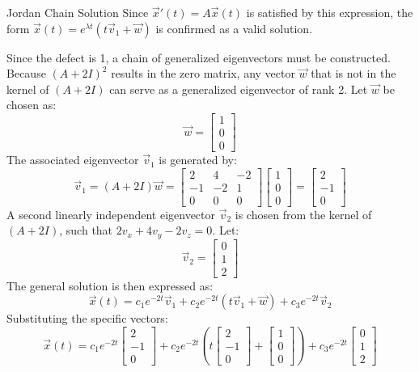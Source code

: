 \begin{enumerate}
\begin{define}{Jordan Chain Solution}
  Since $\vec{x}'(t) = A\vec{x}(t)$ is satisfied by this expression, the form $\vec{x}(t) = e^{\lambda t}(t\vec{v}_1 + \vec{w})$ is confirmed as a valid solution.
\end{define}
  Since the defect is 1, a chain of generalized eigenvectors must be constructed. Because $(A+2I)^2$ results in the zero matrix, any vector $\vec{w}$ that is not in the kernel of $(A+2I)$ can serve as a generalized eigenvector of rank 2. Let $\vec{w}$ be chosen as:
  \[
  \vec{w} = \begin{bmatrix} 1 \\ 0 \\ 0 \end{bmatrix}
  \]
  The associated eigenvector $\vec{v}_1$ is generated by:
  \[
  \vec{v}_1 = (A+2I)\vec{w} = \begin{bmatrix} 2 & 4 & -2 \\ -1 & -2 & 1 \\ 0 & 0 & 0 \end{bmatrix} \begin{bmatrix} 1 \\ 0 \\ 0 \end{bmatrix} = \begin{bmatrix} 2 \\ -1 \\ 0 \end{bmatrix}
  \]
  A second linearly independent eigenvector $\vec{v}_2$ is chosen from the kernel of $(A+2I)$, such that $2v_x + 4v_y - 2v_z = 0$. Let:
  \[
  \vec{v}_2 = \begin{bmatrix} 0 \\ 1 \\ 2 \end{bmatrix}
  \]
  The general solution is then expressed as:
  \[
  \vec{x}(t) = c_1 e^{-2t} \vec{v}_1 + c_2 e^{-2t} (t \vec{v}_1 + \vec{w}) + c_3 e^{-2t} \vec{v}_2
  \]
  Substituting the specific vectors:
  \[
  \vec{x}(t) = c_1 e^{-2t} \begin{bmatrix} 2 \\ -1 \\ 0 \end{bmatrix} + c_2 e^{-2t} \left( t \begin{bmatrix} 2 \\ -1 \\ 0 \end{bmatrix} + \begin{bmatrix} 1 \\ 0 \\ 0 \end{bmatrix} \right) + c_3 e^{-2t} \begin{bmatrix} 0 \\ 1 \\ 2 \end{bmatrix}
  \]
  \newpage


\end{enumerate}
